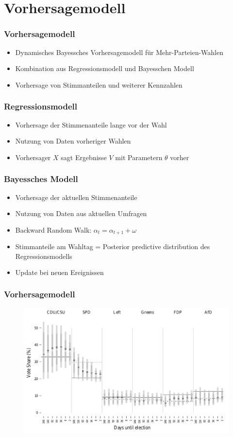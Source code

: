 \documentclass[aspectratio=169,xcolor=dvipsnames]{beamer}
\begin{document}
\section{Vorhersagemodell}

\begin{frame}
	\frametitle{Vorhersagemodell}
		\begin{itemize}
			\item Dynamisches Bayessches Vorhersagemodell für Mehr-Parteien-Wahlen 
			\item Kombination aus Regressionsmodell und Bayesschen Modell
			\item Vorhersage von Stimmanteilen und weiterer Kennzahlen
		\end{itemize}
\end{frame}

\begin{frame}
	\frametitle{Regressionsmodell}
	\begin{itemize}
		\item Vorhersage der Stimmenanteile lange vor der Wahl
		\item Nutzung von Daten vorheriger Wahlen
		\item Vorhersager $X$ sagt Ergebnisse $V$ mit Parametern $\theta$ vorher
	\end{itemize}
\end{frame}

\begin{frame}
	\frametitle{Bayessches Modell}
	\begin{itemize}
		\item<1 -> Vorhersage der aktuellen Stimmenanteile
		\item<1 -> Nutzung von Daten aus aktuellen Umfragen
		\item<2 -> Backward Random Walk: $\alpha_t = \alpha_{t+1} + \omega$
		\item<3 -> Stimmanteile am Wahltag = Posterior predictive distribution des Regressionsmodells
		\item<4 -> Update bei neuen Ereignissen
	\end{itemize}
\end{frame}

\begin{frame}
	\frametitle{Vorhersagemodell}
	\begin{figure}
		\includegraphics[height=0.85\textheight]{development}
	\end{figure}
\end{frame}
\end{document}
